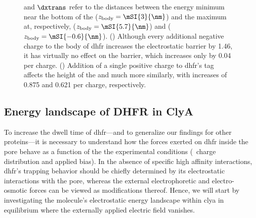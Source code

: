 \begin{figure*}[p]
{    and $\dxtrans$ refer to the distances between the energy minimum near the bottom of the \lumen{}
    ($z_{\rm{body}} = \mSI{3}{\nm}$) and the maximum at, respectively, \cisi{} ($z_{\rm{body}} =
    \mSI{5.7}{\nm}$) and \transi{} ($z_{\rm{body}} = \mSI{-0.6}{\nm}$).
    ()
    Although every additional negative charge to the body of \gls{dhfr} increases the \transi{} electrostatic
    barrier by \SI{1.46}{\kT}, it has virtually no effect on the \cisi{} barrier, which increases only by
    \SI{0.04}{\kT} per charge.
    ()
    Addition of a single positive charge to \gls{dhfr}'s tag affects the height of the \transi{} and \cisi{}
    much more similarly, with increases of \SI{0.875}{\kT} and \SI{0.621}{\kT} per charge, respectively.
  }\label{fig:apbs_simulation_results}
\end{figure*}
%


\subsection{Energy landscape of {DHFR} in {ClyA}}
%

To increase the dwell time of \gls{dhfr}---and to generalize our findings for other proteins---it is necessary
to understand how the forces exerted on \gls{dhfr} inside the pore behave as a function of the the
experimental conditions (\ie~charge distribution and applied bias). In the absence of specific high affinity
interactions, \gls{dhfr}'s trapping behavior should be chiefly determined by its electrostatic interactions
with the pore, whereas the external electrophoretic and electro-osmotic forces can be viewed as modifications
thereof. Hence, we will start by investigating the molecule's electrostatic energy landscape within \gls{clya}
in equilibrium where the externally applied electric field vanishes.

